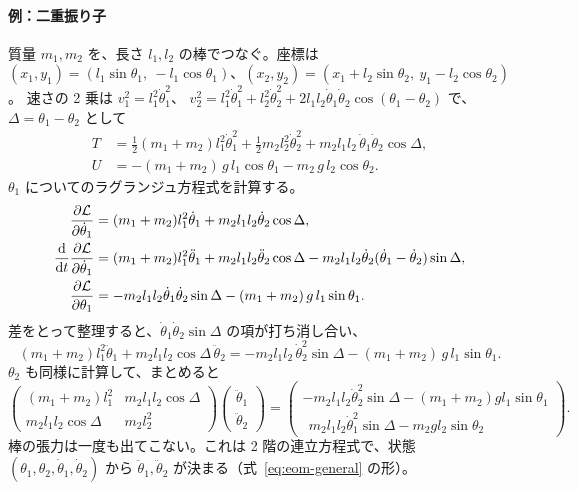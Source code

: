 \paragraph{例：二重振り子}
質量 $m_1,m_2$ を、長さ $l_1,l_2$ の棒でつなぐ。座標は
$(x_1,y_1)=(l_1\sin\theta_1,\ -l_1\cos\theta_1)$、$(x_2,y_2)=(x_1+l_2\sin\theta_2,\ y_1-l_2\cos\theta_2)$。
速さの 2 乗は $v_1^2=l_1^2\dot\theta_1^2$、
$v_2^2=l_1^2\dot\theta_1^2+l_2^2\dot\theta_2^2+2l_1l_2\dot\theta_1\dot\theta_2\cos(\theta_1-\theta_2)$ で、
$\Delta=\theta_1-\theta_2$ として
\begin{align}
  T&=\tfrac12(m_1+m_2)l_1^2\dot\theta_1^2+\tfrac12m_2l_2^2\dot\theta_2^2+m_2l_1l_2\,\dot\theta_1\dot\theta_2\cos\Delta,\\
  U&=-(m_1+m_2)\,g\,l_1\cos\theta_1-m_2\,g\,l_2\cos\theta_2 .
\end{align}
$\theta_1$ についてのラグランジュ方程式を計算する。
\begin{align}
  \frac{\partial \mathcal{L}}{\partial \dot\theta_1}&=(m_1+m_2)l_1^2\dot\theta_1+m_2l_1l_2\dot\theta_2\cos\Delta,\\
  \frac{\mathrm{d} }{\mathrm{d} t}\frac{\partial \mathcal{L}}{\partial \dot\theta_1}&=(m_1+m_2)l_1^2\ddot\theta_1+m_2l_1l_2\ddot\theta_2\cos\Delta
    -m_2l_1l_2\dot\theta_2(\dot\theta_1-\dot\theta_2)\sin\Delta,\\
  \frac{\partial \mathcal{L}}{\partial \theta_1}&=-m_2l_1l_2\dot\theta_1\dot\theta_2\sin\Delta-(m_1+m_2)\,g\,l_1\sin\theta_1 .
\end{align}
差をとって整理すると、$\dot\theta_1\dot\theta_2\sin\Delta$ の項が打ち消し合い、
\begin{equation}
  (m_1+m_2)l_1^2\ddot\theta_1+m_2l_1l_2\cos\Delta\,\ddot\theta_2
  =-m_2l_1l_2\,\dot\theta_2^2\sin\Delta-(m_1+m_2)\,g\,l_1\sin\theta_1 .
\end{equation}
$\theta_2$ も同様に計算して、まとめると
\begin{equation}
  \begin{pmatrix}(m_1+m_2)l_1^2 & m_2l_1l_2\cos\Delta\\ m_2l_1l_2\cos\Delta & m_2l_2^2\end{pmatrix}
  \begin{pmatrix}\ddot\theta_1\\ \ddot\theta_2\end{pmatrix}=
  \begin{pmatrix}-m_2l_1l_2\dot\theta_2^2\sin\Delta-(m_1+m_2)gl_1\sin\theta_1\\
  \ \ m_2l_1l_2\dot\theta_1^2\sin\Delta-m_2gl_2\sin\theta_2\end{pmatrix}.
  \label{eq:double-pendulum}
\end{equation}
棒の張力は一度も出てこない。これは 2 階の連立方程式で、状態 $(\theta_1,\theta_2,\dot\theta_1,\dot\theta_2)$ から
$\ddot\theta_1,\ddot\theta_2$ が決まる（式~\eqref{eq:eom-general} の形）。

